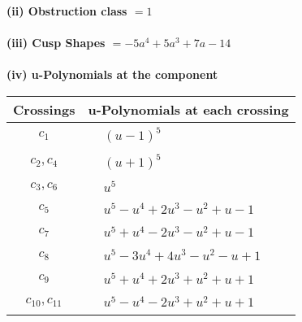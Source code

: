 \documentclass[1p]{elsarticle_modified}
\theoremstyle{definition}
\begin{document}
\flushleft \textbf{(ii) Obstruction class $= 1$}\\~\\
\flushleft \textbf{(iii) Cusp Shapes $= -5 a^4+5 a^3+7 a-14$}\\~\\
\newpage\renewcommand{\arraystretch}{1}
\flushleft \textbf{(iv) u-Polynomials at the component}\newline \\
\begin{tabular}{m{50pt}|m{274pt}}
Crossings & \hspace{64pt}u-Polynomials at each crossing \\
\hline $$\begin{aligned}c_{1}\end{aligned}$$&$\begin{aligned}
&(u-1)^5
\end{aligned}$\\
\hline $$\begin{aligned}c_{2},c_{4}\end{aligned}$$&$\begin{aligned}
&(u+1)^5
\end{aligned}$\\
\hline $$\begin{aligned}c_{3},c_{6}\end{aligned}$$&$\begin{aligned}
&u^5
\end{aligned}$\\
\hline $$\begin{aligned}c_{5}\end{aligned}$$&$\begin{aligned}
&u^5- u^4+2 u^3- u^2+u-1
\end{aligned}$\\
\hline $$\begin{aligned}c_{7}\end{aligned}$$&$\begin{aligned}
&u^5+u^4-2 u^3- u^2+u-1
\end{aligned}$\\
\hline $$\begin{aligned}c_{8}\end{aligned}$$&$\begin{aligned}
&u^5-3 u^4+4 u^3- u^2- u+1
\end{aligned}$\\
\hline $$\begin{aligned}c_{9}\end{aligned}$$&$\begin{aligned}
&u^5+u^4+2 u^3+u^2+u+1
\end{aligned}$\\
\hline $$\begin{aligned}c_{10},c_{11}\end{aligned}$$&$\begin{aligned}
&u^5- u^4-2 u^3+u^2+u+1
\end{aligned}$\\
\hline
\end{tabular}\\~\\
\end{document}
